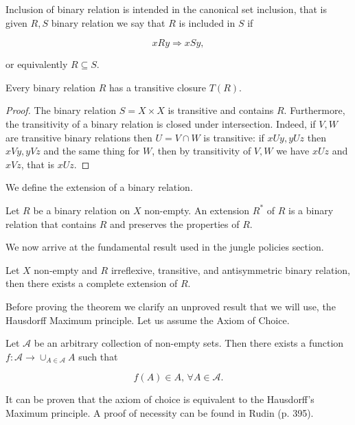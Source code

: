 Inclusion of binary relation is intended in the canonical set inclusion, that is given $R,S$ binary relation we say that $R$ is included in $S$ if

\[xRy \Rightarrow xSy,\]

or equivalently $R\subseteq S$.

\begin{proposition}
    Every binary relation $R$ has a transitive closure $T(R)$.

    \begin{proof}
        The binary relation $S=X\times X$ is transitive and contains $R$. Furthermore, the transitivity of a binary relation is closed under intersection. Indeed, if $V,W$ are transitive binary relations then $U=V\cap W$ is transitive: if $xUy,yUz$ then $xVy,yVz$ and the same thing for $W$, then by transitivity of $V,W$ we have $xUz$ and $xVz$, that is $xUz$. 
    \end{proof}
\end{proposition}

We define the extension of a binary relation.

\begin{definition}
    Let $R$ be a binary relation on $X$ non-empty. An extension $R^{\ast}$ of $R$ is a binary relation that contains $R$ and preserves the properties of $R$.  
\end{definition}

We now arrive at the fundamental result used in the jungle policies section.

\begin{theorem*}
    Let $X$ non-empty and $R$ irreflexive, transitive, and antisymmetric binary relation, then there exists a complete extension of $R$.
\end{theorem*}

Before proving the theorem we clarify an unproved result that we will use, the Hausdorff Maximum principle. Let us assume the Axiom of Choice.

\begin{axiom}
    Let $\mathcal{A}$ be an arbitrary collection of non-empty sets. Then there exists a function $f:\mathcal{A} \rightarrow \cup_{A\in\mathcal{A}}A$ such that

    \[f(A)\in A,\,\forall A\in\mathcal{A}.\]
\end{axiom}

It can be proven that the axiom of choice is equivalent to the Hausdorff's Maximum principle. A proof of necessity can be found in Rudin \cite{rudin1976principles} (p. 395).

